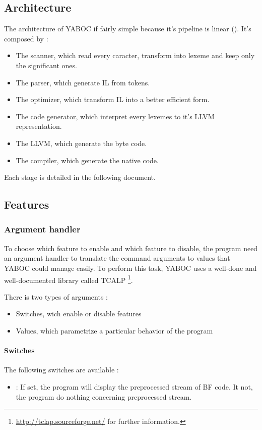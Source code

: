 \subsection{Architecture}
The architecture of \gls{YABOC} if fairly simple because it's pipeline is
linear (\cf {}).
It's composed by :
\begin{itemize}
        \item The scanner, which read every caracter, transform into \gls{lexeme} and 
  keep only the significant ones.
        \item The parser, which generate \gls{IL} from tokens.
        \item The optimizer, which transform \gls{IL} into a better efficient 
  form.
        \item The code generator, which interpret every lexemes to it's LLVM 
  representation.
        \item The LLVM, which generate the byte code.
        \item The compiler, which generate the native code.
\end{itemize}

\newpar Each stage is detailed in the following document.

\subsection{Features}
\subsubsection{Argument handler}
To choose which feature to enable and which feature to disable, the program
need an argument handler to translate the command arguments to values that 
YABOC could manage easily. To perform this task, YABOC uses a well-done and 
well-documented library called TCALP \footnote{\cf 
\url{http://tclap.sourceforge.net/} for further information.}.

There is two types of arguments :
\begin{itemize}
        \item Switches, wich enable or disable features
        \item Values, which parametrize a particular behavior of the program
\end{itemize}

\paragraph{Switches} 
The following switches are available :
\begin{itemize}
        \item {} : If set, the program will display the
  preprocessed stream of BF code. It not, the program do nothing concerning 
  preprocessed stream.
\end{itemize}

